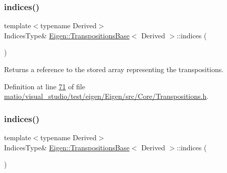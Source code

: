 \mbox{\label{class_eigen_1_1_transpositions_base_a20eda0545eb00e887959f38b3a428a96}} 
\subsubsection{\texorpdfstring{indices()}{indices()}\hspace{0.1cm}{\footnotesize\ttfamily [3/4]}}
{\footnotesize\ttfamily template$<$typename Derived$>$ \\
Indices\+Type\& \hyperlink{class_eigen_1_1_transpositions_base}{Eigen\+::\+Transpositions\+Base}$<$ Derived $>$\+::indices (\begin{DoxyParamCaption}{ }\end{DoxyParamCaption})\hspace{0.3cm}{\ttfamily [inline]}}

\begin{DoxyReturn}{Returns}
a reference to the stored array representing the transpositions. 
\end{DoxyReturn}


Definition at line \hyperlink{matio_2visual__studio_2test_2eigen_2_eigen_2src_2_core_2_transpositions_8h_source_l00071}{71} of file \hyperlink{matio_2visual__studio_2test_2eigen_2_eigen_2src_2_core_2_transpositions_8h_source}{matio/visual\+\_\+studio/test/eigen/\+Eigen/src/\+Core/\+Transpositions.\+h}.

\mbox{\label{class_eigen_1_1_transpositions_base_a20eda0545eb00e887959f38b3a428a96}} 
\subsubsection{\texorpdfstring{indices()}{indices()}\hspace{0.1cm}{\footnotesize\ttfamily [4/4]}}
{\footnotesize\ttfamily template$<$typename Derived$>$ \\
Indices\+Type\& \hyperlink{class_eigen_1_1_transpositions_base}{Eigen\+::\+Transpositions\+Base}$<$ Derived $>$\+::indices (\begin{DoxyParamCaption}{ }\end{DoxyParamCaption})\hspace{0.3cm}{\ttfamily [inline]}}

